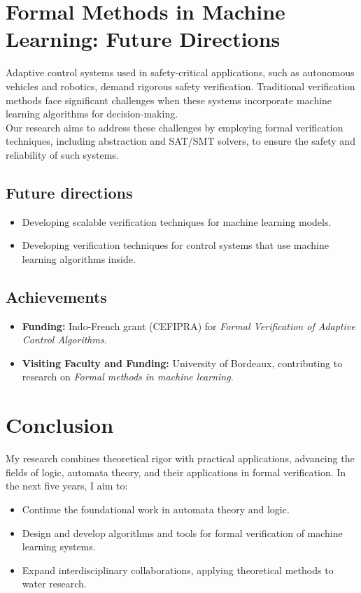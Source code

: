 \documentclass[11pt,a4paper,sans]{moderncv} %
\begin{document}
\section{Formal Methods in Machine Learning: Future Directions}
Adaptive control systems used in safety-critical applications, such as autonomous vehicles and robotics, demand rigorous safety verification. Traditional verification methods face significant challenges when these systems incorporate machine learning algorithms for decision-making.\\

Our research aims to address these challenges by employing formal verification techniques, including abstraction and SAT/SMT solvers, to ensure the safety and reliability of such systems.

\subsection{Future directions}
\begin{itemize}
 \item Developing scalable verification techniques for machine learning models.
 \item Developing verification techniques for control systems that use machine learning algorithms inside.
\end{itemize}

\subsection{Achievements}
\begin{itemize}
    \item \textbf{Funding:} Indo-French grant (CEFIPRA) for \emph{Formal Verification of Adaptive Control Algorithms}.
    \item \textbf{Visiting Faculty and Funding:} University of Bordeaux, contributing to research on \emph{Formal methods in machine learning}.
\end{itemize}



\section{Conclusion}
My research combines theoretical rigor with practical applications, advancing the fields of logic, automata theory, and their applications in formal verification. In the next five years, I aim to:
\begin{itemize}
    \item Continue the foundational work in automata theory and logic.
    \item Design and develop algorithms and tools for formal verification of machine learning systems.
    \item Expand interdisciplinary collaborations, applying theoretical methods to water research.
\end{itemize}




\end{document}
